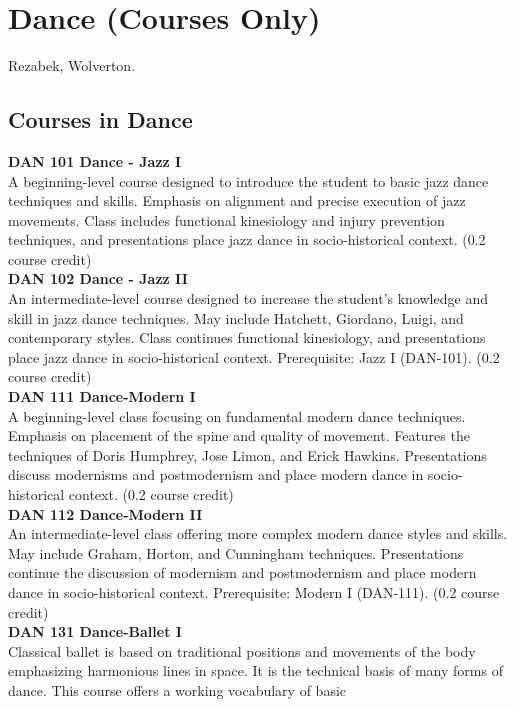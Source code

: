 \documentclass[
  letterpaper,
]{scrbook}
\begin{document}
\section{Dance (Courses Only)}\label{sec-dance}

Rezabek, Wolverton.

\subsection{Courses in Dance}\label{courses-in-dance}

\textbf{DAN 101 Dance - Jazz I}\\
A beginning-level course designed to introduce the student to basic jazz
dance techniques and skills. Emphasis on alignment and precise execution
of jazz movements. Class includes functional kinesiology and injury
prevention techniques, and presentations place jazz dance in
socio-historical context. (0.2 course credit)\\
\textbf{DAN 102 Dance - Jazz II}\\
An intermediate-level course designed to increase the student's
knowledge and skill in jazz dance techniques. May include Hatchett,
Giordano, Luigi, and contemporary styles. Class continues functional
kinesiology, and presentations place jazz dance in socio-historical
context. Prerequisite: Jazz I (DAN-101). (0.2 course credit)\\
\textbf{DAN 111 Dance-Modern I}\\
A beginning-level class focusing on fundamental modern dance techniques.
Emphasis on placement of the spine and quality of movement. Features the
techniques of Doris Humphrey, Jose Limon, and Erick Hawkins.
Presentations discuss modernisms and postmodernism and place modern
dance in socio-historical context. (0.2 course credit)\\
\textbf{DAN 112 Dance-Modern II}\\
An intermediate-level class offering more complex modern dance styles
and skills. May include Graham, Horton, and Cunningham techniques.
Presentations continue the discussion of modernism and postmodernism and
place modern dance in socio-historical context. Prerequisite: Modern I
(DAN-111). (0.2 course credit)\\
\textbf{DAN 131 Dance-Ballet I}\\
Classical ballet is based on traditional positions and movements of the
body emphasizing harmonious lines in space. It is the technical basis of
many forms of dance. This course offers a working vocabulary of basic
\end{document}
